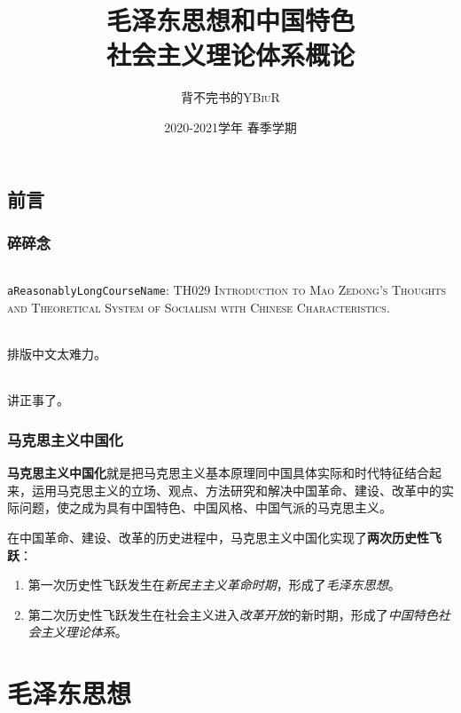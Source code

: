 \documentclass[oneside]{book}
\title{\Huge\textbf{毛泽东思想和中国特色\\社会主义理论体系概论}}
\author{背不完书的\textsc{YBiuR}}
\date{2020-2021学年{} 春季学期}
\begin{document}
\begin{spacing}{1.2}
\setlength{\parindent}{0em}
\setlength{\parskip}{1em}

\frontmatter
\maketitle
\chapter*{前言}
\section*{碎碎念}
\paragraph{}\verb|aReasonablyLongCourseName|: \textsc{TH029 Introduction to Mao Zedong's Thoughts and Theoretical System of Socialism with Chinese Characteristics}.
\paragraph{}排版中文太难力。
\paragraph{}讲正事了。


\section*{马克思主义中国化}
    \textbf{马克思主义中国化}就是把马克思主义基本原理同中国具体实际和时代特征结合起来，运用马克思主义的立场、观点、方法研究和解决中国革命、建设、改革中的实际问题，使之成为具有中国特色、中国风格、中国气派的马克思主义。

    在中国革命、建设、改革的历史进程中，马克思主义中国化实现了\textbf{两次历史性飞跃}：
    \begin{enumerate}
        \item 第一次历史性飞跃发生在\emph{新民主主义革命时期}，形成了\emph{毛泽东思想}。
        \item 第二次历史性飞跃发生在社会主义进入\emph{改革开放}的新时期，形成了\emph{中国特色社会主义理论体系}。
    \end{enumerate}


\tableofcontents

\mainmatter
\part{毛泽东思想}






\end{spacing}
\end{document}
